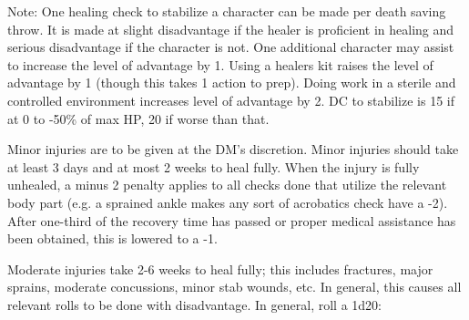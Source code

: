\documentclass[letterpaper,12pt]{article}
\begin{document}
Note: One healing check to stabilize a character can be made per death saving throw. It is made at slight disadvantage if the healer is proficient in healing and serious disadvantage if the character is not. One additional character may assist to increase the level of advantage by 1. Using a healers kit raises the level of advantage by 1 (though this takes 1 action to prep). Doing work in a sterile and controlled environment increases level of advantage by 2. DC to stabilize is 15 if at 0 to -50\% of max HP, 20 if worse than that.

Minor injuries are to be given at the DM's discretion. Minor injuries should take at least 3 days and at most 2 weeks to heal fully. When the injury is fully unhealed, a minus 2 penalty applies to all checks done that utilize the relevant body part (e.g. a sprained ankle makes any sort of acrobatics check have a -2). After one-third of the recovery time has passed or proper medical assistance has been obtained, this is lowered to a -1. 

Moderate injuries take 2-6 weeks to heal fully; this includes fractures, major sprains, moderate concussions, minor stab wounds, etc. In general, this causes all relevant rolls to be done with disadvantage. In general, roll a 1d20:
\end{document}
